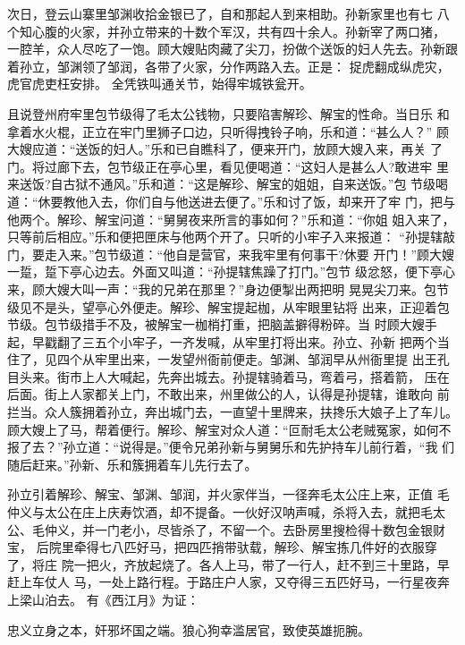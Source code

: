 次日，登云山寨里邹渊收拾金银已了，自和那起人到来相助。孙新家里也有七
八个知心腹的火家，并孙立带来的十数个军汉，共有四十余人。孙新宰了两口猪，
一腔羊，众人尽吃了一饱。顾大嫂贴肉藏了尖刀，扮做个送饭的妇人先去。孙新跟
着孙立，邹渊领了邹润，各带了火家，分作两路入去。正是：
捉虎翻成纵虎灾，虎官虎吏枉安排。
全凭铁叫通关节，始得牢城铁瓮开。

且说登州府牢里包节级得了毛太公钱物，只要陷害解珍、解宝的性命。当日乐
和拿着水火棍，正立在牢门里狮子口边，只听得拽铃子响，乐和道：“甚么人？”
顾大嫂应道：“送饭的妇人。”乐和已自瞧科了，便来开门，放顾大嫂入来，再关
了门。将过廊下去，包节级正在亭心里，看见便喝道：“这妇人是甚么人?敢进牢
里来送饭?自古狱不通风。”乐和道：“这是解珍、解宝的姐姐，自来送饭。”包
节级喝道：“休要教他入去，你们自与他送进去便了。”乐和讨了饭，却来开了牢
门，把与他两个。解珍、解宝问道：“舅舅夜来所言的事如何？”乐和道：“你姐
姐入来了，只等前后相应。”乐和便把匣床与他两个开了。只听的小牢子入来报道：
“孙提辖敲门，要走入来。”包节级道：“他自是营官，来我牢里有何事干?休要
开门！”顾大嫂一踅，踅下亭心边去。外面又叫道：“孙提辖焦躁了打门。”包节
级忿怒，便下亭心来，顾大嫂大叫一声：“我的兄弟在那里？”身边便掣出两把明
晃晃尖刀来。包节级见不是头，望亭心外便走。解珍、解宝提起枷，从牢眼里钻将
出来，正迎着包节级。包节级措手不及，被解宝一枷梢打重，把脑盖擗得粉碎。当
时顾大嫂手起，早戳翻了三五个小牢子，一齐发喊，从牢里打将出来。孙立、孙新
把两个当住了，见四个从牢里出来，一发望州衙前便走。邹渊、邹润早从州衙里提
出王孔目头来。街市上人大喊起，先奔出城去。孙提辖骑着马，弯着弓，搭着箭，
压在后面。街上人家都关上门，不敢出来，州里做公的人，认得是孙提辖，谁敢向
前拦当。众人簇拥着孙立，奔出城门去，一直望十里牌来，扶搀乐大娘子上了车儿。
顾大嫂上了马，帮着便行。解珍、解宝对众人道：“叵耐毛太公老贼冤家，如何不
报了去？”孙立道：“说得是。”便令兄弟孙新与舅舅乐和先护持车儿前行着，“我
们随后赶来。”孙新、乐和簇拥着车儿先行去了。

孙立引着解珍、解宝、邹渊、邹润，并火家伴当，一径奔毛太公庄上来，正值
毛仲义与太公在庄上庆寿饮酒，却不提备。一伙好汉呐声喊，杀将入去，就把毛太
公、毛仲义，并一门老小，尽皆杀了，不留一个。去卧房里搜检得十数包金银财宝，
后院里牵得七八匹好马，把四匹捎带驮载，解珍、解宝拣几件好的衣服穿了，将庄
院一把火，齐放起烧了。各人上马，带了一行人，赶不到三十里路，早赶上车仗人
马，一处上路行程。于路庄户人家，又夺得三五匹好马，一行星夜奔上梁山泊去。
有《西江月》为证：

忠义立身之本，奸邪坏国之端。狼心狗幸滥居官，致使英雄扼腕。

